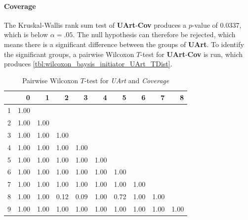 \paragraph{Coverage}
The Kruskal-Wallis rank sum test of \textbf{UArt}-\textbf{Cov} produces a $p$-value of 0.0337, which is below $\alpha=.05$. The null hypothesis can therefore be rejected, which means there is a significant difference between the groups of \textbf{UArt}. To identify the significant groups, a pairwise Wilcoxon $T$-test for \textbf{UArt}-\textbf{Cov} is run, which produces \cref{tbl:wilcoxon_baysis_initiator_UArt_TDist}. 
\begin{table}[ht]
	\tiny
	\centering
    \begin{tabular}{rrrrrrrrrr}
        \toprule
        & 0 & 1 & 2 & 3 & 4 & 5 & 6 & 7 & 8 \\ 
        \midrule
        1 & 1.00 &  &  &  &  &  &  &  &  \\ 
        2 & 1.00 & 1.00 &  &  &  &  &  &  &  \\ 
        3 & 1.00 & 1.00 & 1.00 &  &  &  &  &  &  \\ 
        4 & 1.00 & 1.00 & 1.00 & 1.00 &  &  &  &  &  \\ 
        5 & 1.00 & 1.00 & 1.00 & 1.00 & 1.00 &  &  &  &  \\ 
        6 & 1.00 & 1.00 & 1.00 & 1.00 & 1.00 & 1.00 &  &  &  \\ 
        7 & 1.00 & 1.00 & 1.00 & 1.00 & 1.00 & 1.00 & 1.00 &  &  \\ 
        8 & 1.00 & 1.00 & 0.12 & 0.09 & 1.00 & 0.72 & 1.00 & 1.00 &  \\ 
        9 & 1.00 & 1.00 & 1.00 & 1.00 & 1.00 & 1.00 & 1.00 & 1.00 & 1.00 \\ 
        \bottomrule
      \end{tabular}
    \caption{Pairwise Wilcoxon $T$-test for \textit{UArt} and \textit{Coverage}}
    \label{tbl:wilcoxon_baysis_initiator_UArt_Cov}
\end{table}
